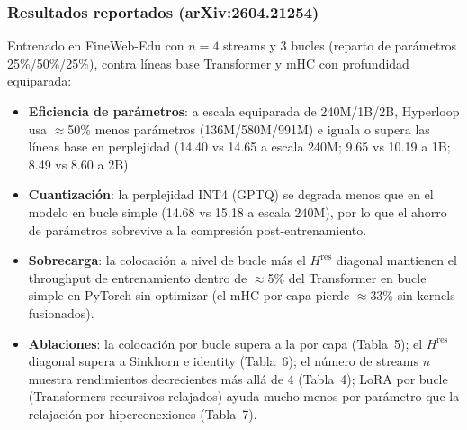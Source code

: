 \subsubsection*{Resultados reportados (arXiv:2604.21254)}

Entrenado en FineWeb-Edu con $n = 4$ streams y 3 bucles (reparto de
parámetros 25\%/50\%/25\%), contra líneas base Transformer y mHC con
profundidad equiparada:
\begin{itemize}[leftmargin=*]
    \item \textbf{Eficiencia de parámetros}: a escala equiparada de
        240M/1B/2B, Hyperloop usa $\approx$50\% menos parámetros
        (136M/580M/991M) e iguala o supera las líneas base en perplejidad
        (14.40 vs 14.65 a escala 240M; 9.65 vs 10.19 a 1B; 8.49 vs 8.60 a 2B).
    \item \textbf{Cuantización}: la perplejidad INT4 (GPTQ) se degrada menos
        que en el modelo en bucle simple (14.68 vs 15.18 a escala 240M), por
        lo que el ahorro de parámetros sobrevive a la compresión
        post-entrenamiento.
    \item \textbf{Sobrecarga}: la colocación a nivel de bucle más el
        $H^{\text{res}}$ diagonal mantienen el throughput de entrenamiento
        dentro de $\approx$5\% del Transformer en bucle simple en PyTorch sin
        optimizar (el mHC por capa pierde $\approx$33\% sin kernels
        fusionados).
    \item \textbf{Ablaciones}: la colocación por bucle supera a la por capa
        (Tabla~5); el $H^{\text{res}}$ diagonal supera a Sinkhorn e identity
        (Tabla~6); el número de streams $n$ muestra rendimientos decrecientes
        más allá de 4 (Tabla~4); LoRA por bucle (Transformers recursivos
        relajados) ayuda mucho menos por parámetro que la relajación por
        hiperconexiones (Tabla~7).
\end{itemize}
